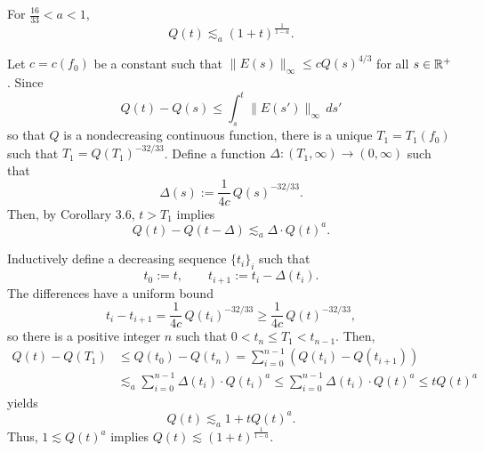 \documentclass[12pt]{article}
\begin{document}
\begin{thm*}
For $\frac{16}{33}<a<1$,
\[Q(t)\lesssim_a(1+t)^{\frac1{1-a}}.\]
\end{thm*}

\begin{pf}
Let $c=c(f_0)$ be a constant such that
$\|E(s)\|_\infty\le cQ(s)^{4/3}$
for all $s\in\mathbb{R}^+$.
Since
\[Q(t)-Q(s)\le\int_s^t\|E(s')\|_\infty\,ds'\]
so that $Q$ is a nondecreasing continuous function, there is a unique $T_1=T_1(f_0)$ such that $T_1=Q(T_1)^{-32/33}$.
Define a function $\Delta:(T_1,\infty)\to(0,\infty)$ such that
\[\Delta(s):=\frac1{4c}\,Q(s)^{-32/33}.\]
Then, by Corollary 3.6, $t>T_1$ implies
\[Q(t)-Q(t-\Delta)\lesssim_a\Delta\cdot Q(t)^a.\]

Inductively define a decreasing sequence $\{t_i\}_i$ such that
\[t_0:=t,\qquad t_{i+1}:=t_i-\Delta(t_i).\]
The differences have a uniform bound
\[t_i-t_{i+1}=\frac1{4c}\,Q(t_i)^{-32/33}\ge\frac1{4c}\,Q(t)^{-32/33},\]
so there is a positive integer $n$ such that $0<t_n\le T_1<t_{n-1}$.
Then,
\begin{align*}
Q(t)-Q(T_1)&\le Q(t_0)-Q(t_n)
=\sum_{i=0}^{n-1}(Q(t_i)-Q(t_{i+1}))\\
&\lesssim_a\sum_{i=0}^{n-1}\Delta(t_i)\cdot Q(t_i)^a
\le\sum_{i=0}^{n-1}\Delta(t_i)\cdot Q(t)^a
\le tQ(t)^a
\end{align*}
yields
\[Q(t)\lesssim_a1+tQ(t)^a.\]
Thus, $1\lesssim Q(t)^a$ implies $Q(t)\lesssim(1+t)^{\frac1{1-a}}$.
\end{pf}




\end{document}
